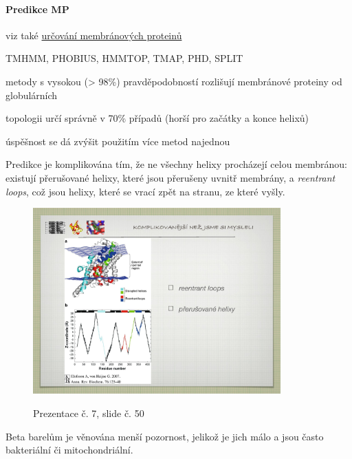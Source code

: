 \documentclass[DIV=8]{scrreprt}
\begin{document}
\paragraph{Predikce MP}
\begin{myItemize}[nosep]
    \item viz také \hyperref[Určování membránových proteinů]{určování membránových proteinů}
    \item TMHMM, PHOBIUS, HMMTOP, TMAP, PHD, SPLIT
    \item metody s vysokou (> 98\%) pravděpodobností rozlišují membránové proteiny od globulárních
\begin{myItemize}[nosep]
    \item topologii určí správně v 70\% případů (horší pro začátky a konce helixů)
    \item úspěšnost se dá zvýšit použitím více metod najednou
\end{myItemize}

\end{myItemize}



Predikce je komplikována tím, že ne všechny helixy procházejí celou membránou: existují přerušované helixy, které jsou přerušeny uvnitř membrány, a \emph{reentrant loops}, což jsou helixy, které se vrací zpět na stranu, ze které vyšly. \begin{figure}
    \caption{Prezentace č. 7, slide č. 50}
    \includegraphics[width=0.85\textwidth]{slides-7/slide-50.jpg}
    \centering
    \label{slides-7-slide-50}
\end{figure}


Beta barelům je věnována menší pozornost, jelikož je jich málo a jsou často bakteriální či mitochondriální.
\end{document}

